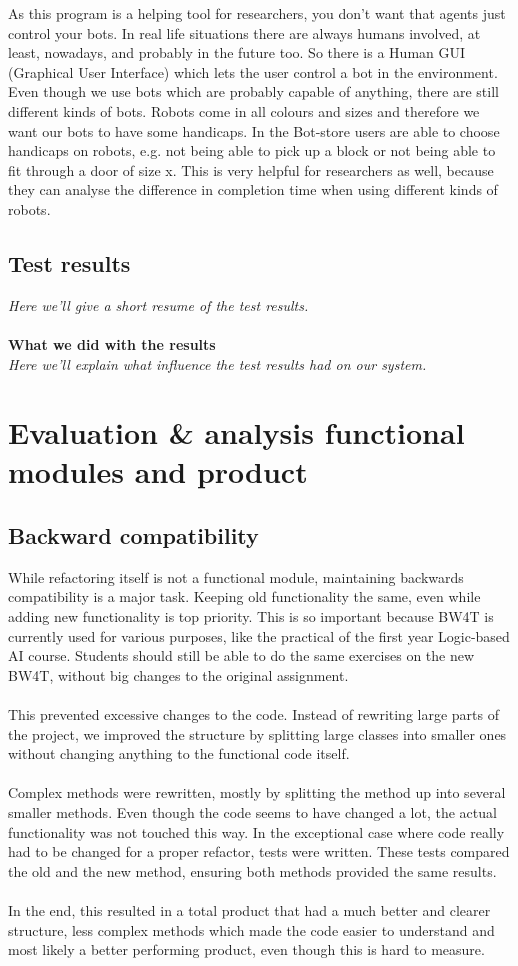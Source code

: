 \documentclass[]{article}
\begin{document}
As this program is a helping tool for researchers, you don't want that agents just control your bots. In real life situations there are always humans involved, at least, nowadays, and probably in the future too. So there is a Human GUI (Graphical User Interface) which lets the user control a bot in the environment. \\

Even though we use bots which are probably capable of anything, there are still different kinds of bots. Robots come in all colours and sizes and therefore we want our bots to have some handicaps. In the Bot-store users are able to choose handicaps on robots, e.g. not being able to pick up a block or not being able to fit through a door of size x. This is very helpful for researchers as well, because they can analyse the difference in completion time when using different kinds of robots.
\subsection{Test results}
\textit{Here we’ll give a short resume of the test results.}\\
\\
\textbf{What we did with the results }\\
\textit{Here we’ll explain what influence the test results had on our system.}
\section{Evaluation \& analysis functional modules and product}
\subsection{Backward compatibility}
While refactoring itself is not a functional module, maintaining backwards compatibility is a major task. Keeping old functionality the same, even while adding new functionality is top priority. This is so important because BW4T is currently used for various purposes, like the practical of the first year Logic-based AI course. Students should still be able to do the same exercises on the new BW4T, without big changes to the original assignment.\\
\\
This prevented excessive changes to the code. Instead of rewriting large parts of the project, we improved the structure by splitting large classes into smaller ones without changing anything to the functional code itself.  \\
\\
Complex methods were rewritten, mostly by splitting the method up into several smaller methods. Even though the code seems to have changed a lot, the actual functionality was not touched this way. In the exceptional case where code really had to be changed for a proper refactor, tests were written. These tests compared the old and the new method, ensuring both methods provided the same results.\\
\\
In the end, this resulted in a total product that had a much better and clearer structure, less complex methods which made the code easier to understand and most likely a better performing product, even though this is hard to measure. 
\end{document}
